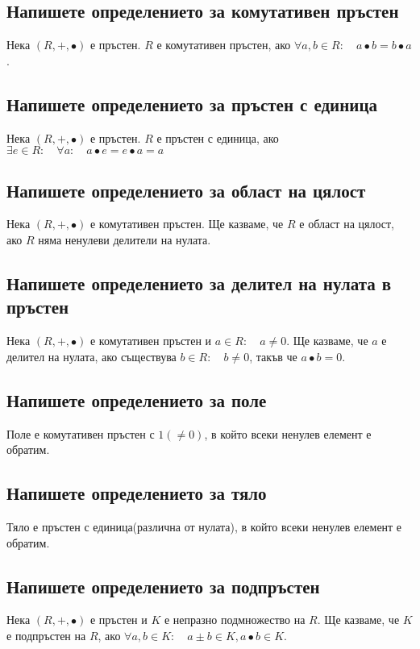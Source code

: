 \documentclass[10pt]{article}
\begin{document}
\subsection*{Напишете определението за комутативен пръстен}
Нека $(R, +, \bullet)$ е пръстен. $R$ е комутативен пръстен, ако $\forall a, b \in R: \quad a \bullet b = b \bullet a$.

\subsection*{Напишете определението за пръстен с единица}
Нека $(R, +, \bullet)$ е пръстен. $R$ е пръстен с единица, ако $\exists e \in R: \quad \forall a: \quad a \bullet e = e \bullet a = a$

\subsection*{Напишете определението за област на цялост}
Нека $(R, +, \bullet)$ е комутативен пръстен. Ще казваме, че $R$ е област на цялост, ако $R$ няма ненулеви делители на нулата.

\subsection*{Напишете определението за делител на нулата в пръстен}
Нека $(R, +, \bullet)$ е комутативен пръстен и $a \in R: \quad a \neq 0$. Ще казваме, че $a$ е делител на нулата, ако съществува $b \in R: \quad b \neq 0$, такъв че $a \bullet b = 0$.

\subsection*{Напишете определението за поле}
Поле е комутативен пръстен с $1(\neq 0)$, в който всеки ненулев елемент е обратим.

\subsection*{Напишете определението за тяло}
Тяло е пръстен с единица(различна от нулата), в който всеки ненулев елемент е обратим.

\subsection*{Напишете определението за подпръстен}
Нека $(R, +, \bullet)$ е пръстен и $K$ е непразно подмножество на $R$. Ще казваме, че $K$ е подпръстен на $R$, ако $\forall a, b \in K: \quad a \pm b \in K, a \bullet b \in K$.
\end{document}
